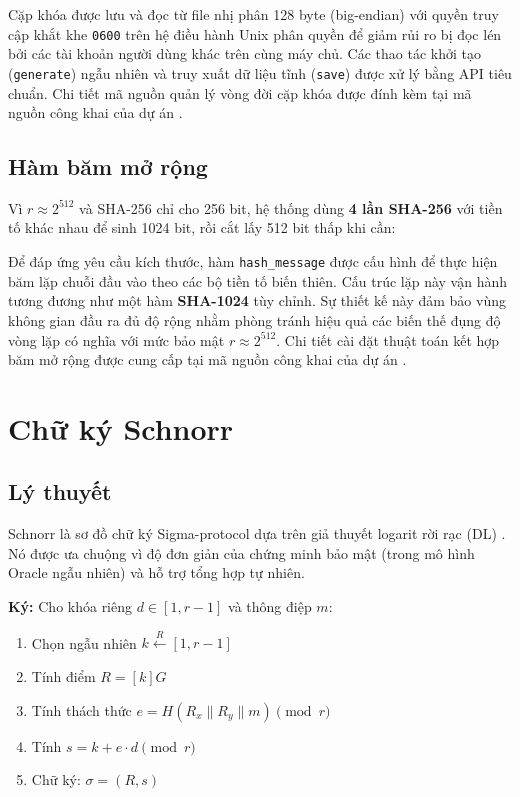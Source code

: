 Cặp khóa được lưu và đọc từ file nhị phân 128 byte (big-endian) với
quyền truy cập khắt khe \texttt{0600} trên hệ điều hành Unix phân quyền
để giảm rủi ro bị đọc lén bởi các tài khoản người dùng khác trên cùng
máy chủ. Các thao tác khởi tạo (\texttt{generate}) ngẫu nhiên và truy
xuất dữ liệu tĩnh (\texttt{save}) được xử lý bằng API tiêu chuẩn. Chi
tiết mã nguồn quản lý vòng đời cặp khóa được đính kèm tại mã nguồn công
khai của dự án \citep{LumenMath}.

\subsection{Hàm băm mở rộng}\label{huxe0m-bux103m-mux1edf-rux1ed9ng}

Vì \(r \approx 2^{512}\) và SHA-256 chỉ cho 256 bit, hệ thống dùng
\textbf{4 lần SHA-256} với tiền tố khác nhau để sinh 1024 bit, rồi cắt
lấy 512 bit thấp khi cần:

Để đáp ứng yêu cầu kích thước, hàm \texttt{hash\_message} được cấu hình
để thực hiện băm lặp chuỗi đầu vào theo các bộ tiền tố biến thiên. Cấu
trúc lặp này vận hành tương đương như một hàm \textbf{SHA-1024} tùy
chỉnh. Sự thiết kế này đảm bảo vùng không gian đầu ra đủ độ rộng nhằm
phòng tránh hiệu quả các biến thế đụng độ vòng lặp có nghĩa với mức bảo
mật \(r \approx 2^{512}\). Chi tiết cài đặt thuật toán kết hợp băm mở
rộng được cung cấp tại mã nguồn công khai của dự án \citep{LumenMath}.

\section{Chữ ký Schnorr}\label{chux1eef-kuxfd-schnorr}

\subsection{Lý thuyết}\label{luxfd-thuyux1ebft}

Schnorr là sơ đồ chữ ký Sigma-protocol dựa trên giả thuyết logarit rời
rạc (DL) \citep{Schnorr1989}. Nó được ưa chuộng vì độ đơn giản của chứng
minh bảo mật (trong mô hình Oracle ngẫu nhiên) và hỗ trợ tổng hợp tự
nhiên.

\textbf{Ký:} Cho khóa riêng \(d \in [1, r-1]\) và thông điệp \(m\):

\begin{enumerate}
\def\labelenumi{\arabic{enumi}.}
\tightlist
\item
  Chọn ngẫu nhiên \(k \xleftarrow{R} [1, r-1]\)
\item
  Tính điểm \(R = [k]G\)
\item
  Tính thách thức \(e = H(R_x \| R_y \| m) \pmod{r}\)
\item
  Tính \(s = k + e \cdot d \pmod{r}\)
\item
  Chữ ký: \(\sigma = (R, s)\)
\end{enumerate}

